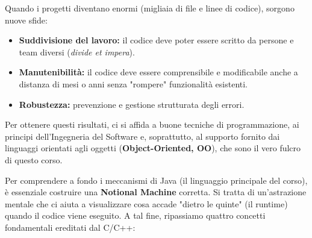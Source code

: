 \documentclass[12pt, a4paper]{article}
\begin{document}
Quando i progetti diventano enormi (migliaia di file e linee di codice), sorgono nuove sfide:
\begin{itemize}
    \item \textbf{Suddivisione del lavoro:} il codice deve poter essere scritto da persone e team diversi (\textit{divide et impera}).
    \item \textbf{Manutenibilità:} il codice deve essere comprensibile e modificabile anche a distanza di mesi o anni senza "rompere" funzionalità esistenti.
    \item \textbf{Robustezza:} prevenzione e gestione strutturata degli errori.
\end{itemize}
Per ottenere questi risultati, ci si affida a buone tecniche di programmazione, ai principi dell'Ingegneria del Software e, soprattutto, al supporto fornito dai linguaggi orientati agli oggetti (\textbf{Object-Oriented, OO}), che sono il vero fulcro di questo corso.

Per comprendere a fondo i meccanismi di Java (il linguaggio principale del corso), è essenziale costruire una \textbf{Notional Machine} corretta. Si tratta di un'astrazione mentale che ci aiuta a visualizzare cosa accade "dietro le quinte" (il runtime) quando il codice viene eseguito. A tal fine, ripassiamo quattro concetti fondamentali ereditati dal C/C++:
\end{document}
